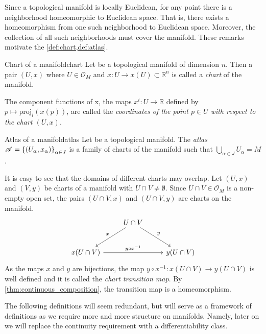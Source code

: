 Since a topological manifold is locally Euclidean, for any point there is a neighborhood homeomorphic to Euclidean space. That is, there exists a homeomorphism from one such neighborhood to Euclidean space. Moreover, the collection of all such neighborhoods must cover the manifold. These remarks motivate the \cref{def:chart,def:atlas}.

\begin{definition}{Chart of a manifold}{chart}
    Let  be a topological manifold of dimension \(n\). Then a pair \((U, x)\) where \(U \in \mathcal{O}_M\) and \(x: U \to x(U) \subset \mathbb{R}^n\) is called a \emph{chart} of the manifold.

    The component functions of x, the maps \(x^i : U \to \mathbb{R}\) defined by \(p \mapsto \mathrm{proj}_i(x(p))\), are called the \emph{coordinates of the point \(p \in U\) with respect to the chart \((U, x)\).}
\end{definition}

\begin{definition}{Atlas of a manifold}{atlas}
    Let  be a topological manifold. The \emph{atlas} \(\mathscr{A} = \left\{(U_\alpha, x_\alpha)\right\}_{\alpha \in J}\) is a family of charts of the manifold such that \(\bigcup_{\alpha\in J}{U_{\alpha}} = M\).
\end{definition}

It is easy to see that the domains of different charts may overlap. Let \((U, x)\) and \((V, y)\) be charts of a manifold  with \(U\cap V \neq \emptyset\). Since \(U \cap V \in \mathcal{O}_M\) is a non-empty open set, the pairs \((U\cap V, x)\) and \((U \cap V, y)\) are charts on the manifold.
\begin{equation*}
    \begin{tikzcd}[column sep = normal, row sep = large]
        & U\cap V \arrow[swap]{ld}{x} \arrow{rd}{y} & \\
        x(U\cap V) \arrow{rr}{y\circ x^{-1}} && y(U\cap V)
    \end{tikzcd}
\end{equation*}
As the maps \(x\) and \(y\) are bijections, the map \(y \circ x^{-1} : x(U\cap V) \to y(U \cap V)\) is well defined and it is called the \emph{chart transition map}. By \cref{thm:continuous_composition}, the transition map is a homeomorphism.

The following definitions will seem redundant, but will serve as a framework of definitions as we require more and more structure on manifolds. Namely, later on we will replace the continuity requirement with a differentiability class.

